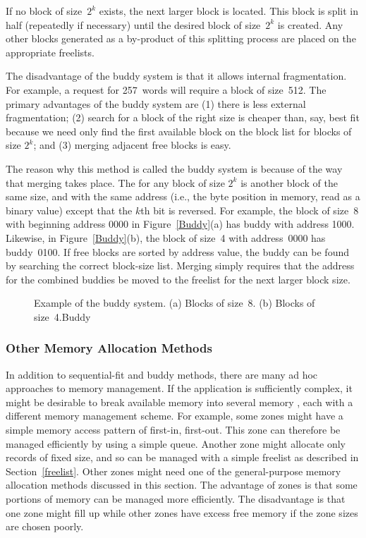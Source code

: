 If no block of size~$2^k$ exists, the next larger block is located.
This block is split in half (repeatedly if necessary) until the
desired block of size~$2^k$ is created.
Any other blocks generated as a by-product of this splitting process
are placed on the appropriate freelists.

The disadvantage of the buddy system is that it allows internal
fragmentation.
For example, a request for 257~words will require a block of size~512.
The primary advantages of the buddy system are (1) there is less
external fragmentation; (2) search for a block of the right size is
cheaper than, say, best fit because we need only find the first
available block on the block list for blocks of size $2^k$; and
(3) merging adjacent free blocks is easy.

The reason why this method is called the buddy system is because
of the way that merging takes place.
The  for any block of size $2^k$ is another block of the
same size, and with the same address
(i.e., the byte position in memory, read as a binary value)
except that the $k$th bit is reversed.
For example, the block of size~8 with beginning address 0000
in Figure~\ref{Buddy}(a) has buddy with address 1000.
Likewise, in Figure~\ref{Buddy}(b), the block of size~4 with
address~0000 has buddy~0100.
If free blocks are sorted by address value, the buddy can be found by
searching the correct block-size list.
Merging simply requires that the address for the combined buddies be
moved to the freelist for the next larger
block size.

\begin{figure}
\vspace{-\bigskipamount}\vspace{-\bigskipamount}
{Example of the buddy system. (a) Blocks of size~8.
(b) Blocks of size~4.}{Buddy}
\vspace{-\smallskipamount}
\end{figure}

\subsubsection{Other Memory Allocation Methods}

In addition to sequential-fit and buddy methods, there are many
ad hoc approaches to memory management.
If the application is sufficiently complex, it might be
desirable to break available memory into several memory
, each with a different memory management scheme.
For example, some zones might have a simple memory access pattern of
first-in, first-out.
This zone can therefore be managed efficiently by using a simple
queue.
Another zone might allocate only records of fixed size, and so can be
managed with a simple freelist as described in Section~\ref{freelist}.
Other zones might need one of the general-purpose memory allocation
methods discussed in this section.
The advantage of zones is that some portions of memory can be managed
more efficiently.
The disadvantage is that one zone might fill up while other zones have
excess free memory if the zone sizes are chosen poorly.

